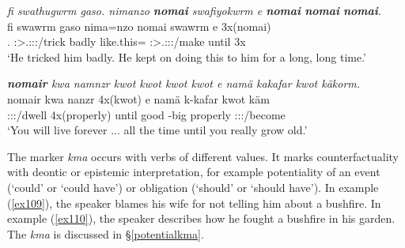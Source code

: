 \begin{exe}
	\ex \emph{fi swathugwrm gaso. nimanzo \textbf{nomai} swafiyokwrm e \textbf{nomai} \textbf{nomai} \textbf{nomai}.}\\
	\gll fi swawrm gaso nima=nzo nomai swawrm e 3x(nomai)\\
	\Tsg.\Abs{} \Stsg:\Sbj>\Tsg.\Masc:\Obj:\Pst:\Dur/trick badly {like.this}=\Only{} \Hab{} \Stsg:\Sbj>\Tsg.\Masc:\Obj:\Pst:\Dur/make until 3x\Hab{}\\
	\trans `He tricked him badly. He kept on doing this to him for a long, long time.'\\ 
	\label{ex107}
\end{exe}
\begin{exe}
	\ex \emph{\textbf{nomair} kwa namnzr kwot kwot kwot kwot e namä kakafar kwot käkorm.}\\
	\gll nomair kwa nanzr 4x(kwot) e namä k-kafar kwot käm\\
	\Hab{} \Fut{} \Ssg:\Sbj:\Nonpast:\Ipfv/dwell 4x(properly) until good \Redup{}-big properly \Ssg:\Sbj:\Imp:\Pfv/become\\
	\trans `You will live forever ... all the time until you really grow old.'\\ 
	\label{ex108}
\end{exe}

The  marker \emph{kma} occurs with verbs of different  values. It marks counterfactuality with deontic or epistemic interpretation, for example potentiality of an event (`could' or `could have') or obligation (`should' or `should have'). In example (\ref{ex109}), the speaker blames his wife for not telling him about a bushfire. In example (\ref{ex110}), the speaker describes how he fought a bushfire in his garden. The  \emph{kma} is discussed in \S{}\ref{potentialkma}.

